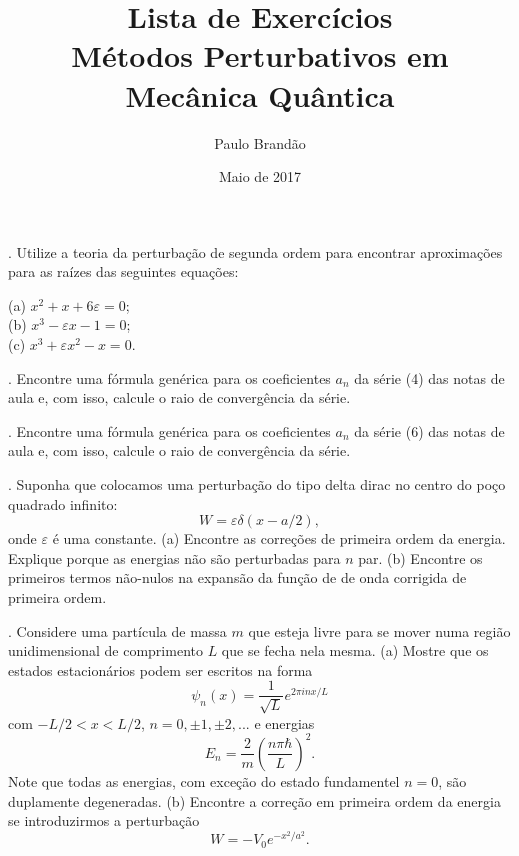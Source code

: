 \documentclass{article}
\title{\color{astral}\textbf{Lista de Exercícios} \\ \textbf{Métodos Perturbativos em Mecânica Quântica}}
\author{Paulo Brandão}
\date{Maio de 2017}
\begin{document}
\maketitle


. Utilize a teoria da perturbação de segunda ordem para encontrar aproximações para as raízes das seguintes equações:

\vspace{1cm}

\noindent (a) $x^2 + x + 6\varepsilon = 0$;\\
\noindent (b) $x^3 - \varepsilon x - 1 = 0$;\\
\noindent (c) $x^3 + \varepsilon x^2 - x = 0$.

\vspace{1cm}

. Encontre uma fórmula genérica para os coeficientes $a_n$ da série (4) das notas de aula e, com isso, calcule o raio de convergência da série.

\vspace{1cm}

. Encontre uma fórmula genérica para os coeficientes $a_n$ da série (6) das notas de aula e, com isso, calcule o raio de convergência da série.

\vspace{1cm}

. Suponha que colocamos uma perturbação do tipo delta dirac no centro do poço quadrado infinito:
\begin{equation}
    W = \varepsilon\delta(x-a/2),
\end{equation}
onde $\varepsilon$ é uma constante. (a) Encontre as correções de primeira ordem da energia. Explique porque as energias não são perturbadas para $n$ par. (b) Encontre os primeiros termos não-nulos na expansão da função de de onda corrigida de primeira ordem.

\vspace{1cm}

. Considere uma partícula de massa $m$ que esteja livre para se mover numa região unidimensional de comprimento $L$ que se fecha nela mesma. (a) Mostre que os estados estacionários podem ser escritos na forma
\begin{equation}
    \psi_n (x) = \frac{1}{\sqrt{L}}e^{2\pi i n x/L}
\end{equation} 
com $-L/2<x<L/2$,  $n = 0,\pm 1,\pm2 ,...$ e energias
\begin{equation}
    E_n = \frac{2}{m}\left( \frac{n\pi\hbar}{L} \right)^2.
\end{equation}
Note que todas as energias, com exceção do estado fundamentel $n = 0$, são duplamente degeneradas. (b) Encontre a correção em primeira ordem da energia se introduzirmos a perturbação
\begin{equation}
    W = -V_{0}e^{-x^2 / a^2}.
\end{equation}
\end{document}
